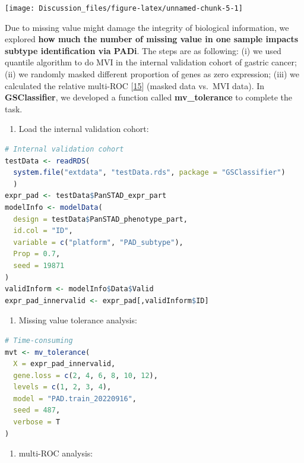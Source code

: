 \documentclass[
  12pt,
]{book}
\providecommand{\tightlist}{%
  \setlength{\itemsep}{0pt}\setlength{\parskip}{0pt}}
\begin{document}
\begin{center}\texttt{[image: Discussion\_files/figure-latex/unnamed-chunk-5-1]} \end{center}

Due to missing value might damage the integrity of biological information, we explored \textbf{how much the number of missing value in one sample impacts subtype identification via PADi}. The steps are as following: (i) we used quantile algorithm to do MVI in the internal validation cohort of gastric cancer; (ii) we randomly masked different proportion of genes as zero expression; (iii) we calculated the relative multi-ROC {[}\protect\hyperlink{ref-pROC}{15}{]} (masked data vs.~MVI data). In \textbf{GSClassifier}, we developed a function called \textbf{mv\_tolerance} to complete the task.

\begin{enumerate}
\def\labelenumi{(\roman{enumi})}
\tightlist
\item
  Load the internal validation cohort:
\end{enumerate}

\begin{lstlisting}[language=R]
# Internal validation cohort
testData <- readRDS(
  system.file("extdata", "testData.rds", package = "GSClassifier")
  )
expr_pad <- testData$PanSTAD_expr_part
modelInfo <- modelData(
  design = testData$PanSTAD_phenotype_part,
  id.col = "ID",
  variable = c("platform", "PAD_subtype"),
  Prop = 0.7,
  seed = 19871
)
validInform <- modelInfo$Data$Valid
expr_pad_innervalid <- expr_pad[,validInform$ID]
\end{lstlisting}

\begin{enumerate}
\def\labelenumi{(\roman{enumi})}
\setcounter{enumi}{1}
\tightlist
\item
  Missing value tolerance analysis:
\end{enumerate}

\begin{lstlisting}[language=R]
# Time-consuming
mvt <- mv_tolerance(
  X = expr_pad_innervalid,
  gene.loss = c(2, 4, 6, 8, 10, 12),
  levels = c(1, 2, 3, 4),
  model = "PAD.train_20220916",
  seed = 487,
  verbose = T
)
\end{lstlisting}

\begin{enumerate}
\def\labelenumi{(\roman{enumi})}
\setcounter{enumi}{2}
\tightlist
\item
  multi-ROC analysis:
\end{enumerate}
\end{document}
